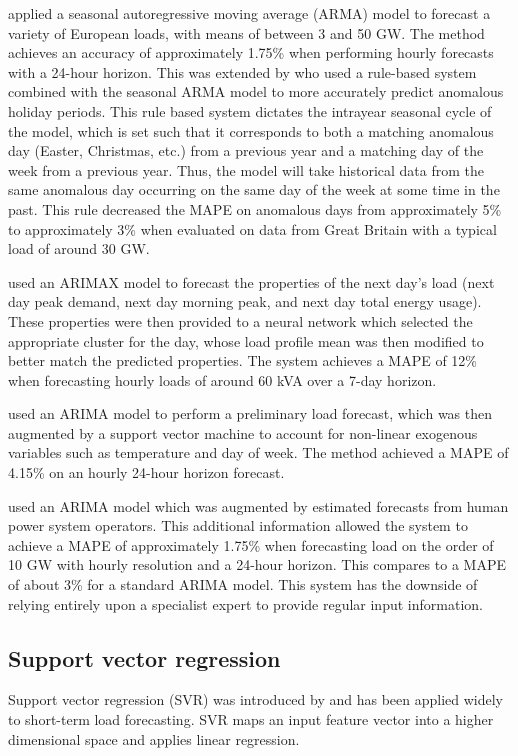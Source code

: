 \citet{Taylor2007} applied a seasonal autoregressive moving average (ARMA) model to forecast a variety of European loads, with means of between 3 and 50 GW.
The method achieves an accuracy of approximately 1.75\% when performing hourly forecasts with a 24-hour horizon.
This was extended by \citet{Arora2013} who used a rule-based system combined with the seasonal ARMA model to more accurately predict anomalous holiday periods.
This rule based system dictates the intrayear seasonal cycle of the model, which is set such that it corresponds to both a matching anomalous day (Easter, Christmas, etc.) from a previous year and a matching day of the week from a previous year.
Thus, the model will take historical data from the same anomalous day occurring on the same day of the week at some time in the past.
This rule decreased the MAPE on anomalous days from approximately 5\% to approximately 3\% when evaluated on data from Great Britain with a typical load of around 30 GW.

\citet{Bennett2014} used an ARIMAX model to forecast the properties of the next day's load (next day peak demand, next day morning peak, and next day total energy usage). These properties were then provided to a neural network which selected the appropriate cluster for the day, whose load profile mean was then modified to better match the predicted properties.
The system achieves a MAPE of 12\% when forecasting hourly loads of around 60 kVA over a 7-day horizon.

\citet{Karthika2017} used an ARIMA model to perform a preliminary load forecast, which was then augmented by a support vector machine to account for non-linear exogenous variables such as temperature and day of week.
The method achieved a MAPE of 4.15\% on an hourly 24-hour horizon forecast.

\citet{Amjady2001} used an ARIMA model which was augmented by estimated forecasts from human power system operators.
This additional information allowed the system to achieve a MAPE of approximately 1.75\% when forecasting load on the order of 10 GW with hourly resolution and a 24-hour horizon.
This compares to a MAPE of about 3\% for a standard ARIMA model.
This system has the downside of relying entirely upon a specialist expert to provide regular input information.

\subsection{Support vector regression}
\label{SVR}
Support vector regression (SVR) was introduced by \citet{Drucker1996} and has been applied widely to short-term load forecasting.
SVR maps an input feature vector into a higher dimensional space and applies linear regression.

